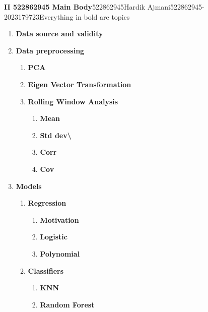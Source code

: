 \documentclass{article} %
\begin{document}
\noindent \textbf{II 522862945 Main Body}522862945Hardik Ajmani522862945-2023179723Everything in bold are topics\textbf{}

\begin{enumerate}
\item \textbf{ Data source and validity}

\item \textbf{ Data preprocessing}

\begin{enumerate}
\item \textbf{ PCA}

\item \textbf{ Eigen Vector Transformation}

\item \textbf{ Rolling Window Analysis}

\begin{enumerate}
\item \textbf{ Mean }

\item \textbf{ Std dev{\textbackslash}}

\item \textbf{ Corr}

\item \textbf{ Cov}
\end{enumerate}
\end{enumerate}

\item \textbf{ Models}

\begin{enumerate}
\item \textbf{ Regression}

\begin{enumerate}
\item \textbf{ Motivation}

\item \textbf{ Logistic}

\item \textbf{ Polynomial}
\end{enumerate}

\item \textbf{ Classifiers}

\begin{enumerate}
\item \textbf{ KNN}

\item \textbf{ Random Forest}
\end{enumerate}


\end{enumerate}
\end{enumerate}
\end{document}
